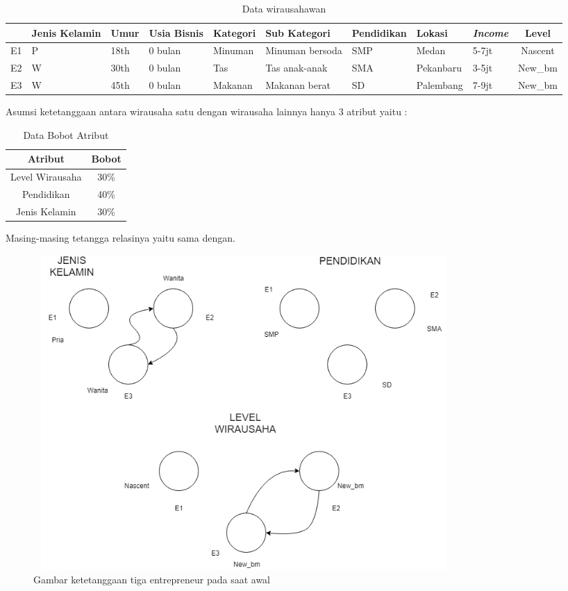 \begin{table} [H]
\centering
\caption{Data wirausahawan}
\begin{tabular}{|c|p{1cm}|p{1cm}|p{1cm}|p{2cm}|p{2cm}|p{2cm}|p{2cm}|p{1cm}|c|}
\hline
& Jenis Kelamin & Umur & Usia Bisnis & Kategori & Sub Kategori & Pendidikan & Lokasi & \textit{Income} & Level\\
\hline
E1 & P & 18th & 0 bulan & Minuman & Minuman bersoda & SMP & Medan & 5-7jt & Nascent\\
\hline
E2 & W & 30th & 0 bulan & Tas & Tas anak-anak  & SMA & Pekanbaru & 3-5jt & New\_bm\\
\hline
E3 & W & 45th & 0 bulan & Makanan & Makanan berat & SD & Palembang & 7-9jt & New\_bm\\
\hline
\end{tabular}
\end{table}

Asumsi ketetanggaan antara wirausaha satu dengan wirausaha lainnya hanya 3 atribut yaitu :

\begin{table} [H]
\centering
\caption{Data Bobot Atribut}
\begin{tabular}{|c|c|}
\hline
Atribut & Bobot\\
\hline
Level Wirausaha & 30\% \\
\hline
Pendidikan & 40\% \\
\hline
Jenis Kelamin & 30\% \\
\hline
\end{tabular}
\end{table}

Masing-masing tetangga relasinya yaitu sama dengan.

	\begin{figure} [H]
		\centering  
		\includegraphics[width=16cm, height=12cm]{t=0} 
		\caption[Gambar ketetanggaan tiga entrepreneur pada saat awal]{Gambar ketetanggaan tiga entrepreneur pada saat awal} 
		\label{fig:t0} 
	\end{figure}


